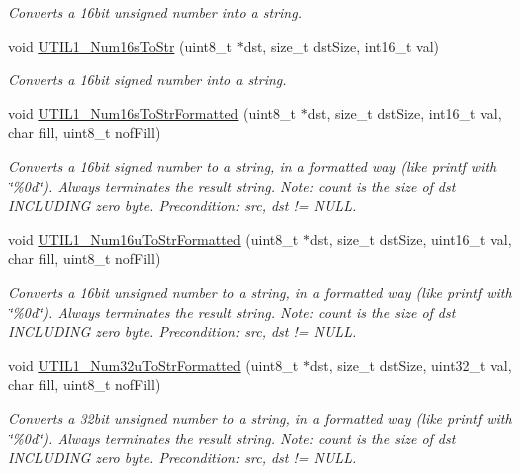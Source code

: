 \begin{DoxyCompactItemize}
\begin{DoxyCompactList}\small\item\em Converts a 16bit unsigned number into a string. \end{DoxyCompactList}\item 
void \hyperlink{group___u_t_i_l1__module_gaa2ec540f5fc0c367af38d4653204a24f}{U\+T\+I\+L1\+\_\+\+Num16s\+To\+Str} (uint8\+\_\+t $\ast$dst, size\+\_\+t dst\+Size, int16\+\_\+t val)
\begin{DoxyCompactList}\small\item\em Converts a 16bit signed number into a string. \end{DoxyCompactList}\item 
void \hyperlink{group___u_t_i_l1__module_ga38d58e4ec9bf79c042fc307ff32dad93}{U\+T\+I\+L1\+\_\+\+Num16s\+To\+Str\+Formatted} (uint8\+\_\+t $\ast$dst, size\+\_\+t dst\+Size, int16\+\_\+t val, char fill, uint8\+\_\+t nof\+Fill)
\begin{DoxyCompactList}\small\item\em Converts a 16bit signed number to a string, in a formatted way (like printf with \char`\"{}\%0d\char`\"{}). Always terminates the result string. Note\+: count is the size of dst I\+N\+C\+L\+U\+D\+I\+NG zero byte. Precondition\+: src, dst != N\+U\+LL. \end{DoxyCompactList}\item 
void \hyperlink{group___u_t_i_l1__module_gaabda98734e584259f80df91feb6463f2}{U\+T\+I\+L1\+\_\+\+Num16u\+To\+Str\+Formatted} (uint8\+\_\+t $\ast$dst, size\+\_\+t dst\+Size, uint16\+\_\+t val, char fill, uint8\+\_\+t nof\+Fill)
\begin{DoxyCompactList}\small\item\em Converts a 16bit unsigned number to a string, in a formatted way (like printf with \char`\"{}\%0d\char`\"{}). Always terminates the result string. Note\+: count is the size of dst I\+N\+C\+L\+U\+D\+I\+NG zero byte. Precondition\+: src, dst != N\+U\+LL. \end{DoxyCompactList}\item 
void \hyperlink{group___u_t_i_l1__module_gabc0a815c91173ed9152eca324d97b4e8}{U\+T\+I\+L1\+\_\+\+Num32u\+To\+Str\+Formatted} (uint8\+\_\+t $\ast$dst, size\+\_\+t dst\+Size, uint32\+\_\+t val, char fill, uint8\+\_\+t nof\+Fill)
\begin{DoxyCompactList}\small\item\em Converts a 32bit unsigned number to a string, in a formatted way (like printf with \char`\"{}\%0d\char`\"{}). Always terminates the result string. Note\+: count is the size of dst I\+N\+C\+L\+U\+D\+I\+NG zero byte. Precondition\+: src, dst != N\+U\+LL. \end{DoxyCompactList}\item 

\end{DoxyCompactItemize}
